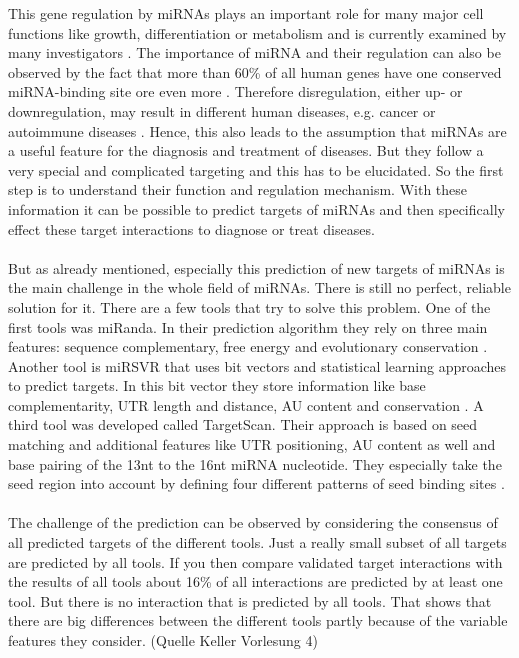 \documentclass[12pt]{article}
\begin{document}
This gene regulation by miRNAs plays an important role for many major cell functions like growth, differentiation or metabolism and is currently examined by many investigators \cite{Ardekani}. The importance of miRNA and their regulation can also be observed by the fact that more than 60\% of all human genes have one conserved miRNA-binding site ore even more \cite{Ha}. Therefore disregulation, either up- or downregulation, may result in different human diseases, e.g. cancer or autoimmune diseases \cite{Ardekani}. Hence, this also leads to the assumption that miRNAs are a useful feature for the diagnosis and treatment of diseases. But they follow a very special and complicated targeting and this has to be elucidated. So the first step is to understand their function and regulation mechanism. With these information it can be possible to predict targets of miRNAs and then specifically effect these target interactions to diagnose or treat diseases. \\\\
But as already mentioned, especially this prediction of new targets of miRNAs is the main challenge in the whole field of miRNAs. There is still no perfect, reliable solution for it. There are a few tools that try to solve this problem. One of the first tools was miRanda. In their prediction algorithm they rely on three main features: sequence complementary, free energy and evolutionary conservation \cite{Enright}. Another tool is miRSVR that uses bit vectors and statistical learning approaches to predict targets. In this bit vector they store information like base complementarity, UTR length and distance, AU content and conservation \cite{Betel}. A third tool was developed called TargetScan. Their approach is based on seed matching and additional features like UTR positioning, AU content as well and base pairing of the 13nt to the 16nt miRNA nucleotide. They especially take the seed region into account by defining four different patterns of seed binding sites \cite{Lewis}.\\\\
The challenge of the prediction can be observed by considering the consensus of all predicted targets of the different tools.  Just a really small subset of all targets are predicted by all tools. If you then compare validated target interactions with the results of all tools about 16\% of all interactions are predicted by at least one tool. But there is no interaction that is predicted by all tools. That shows that there are big differences between the different tools partly because of the variable features they consider. (Quelle Keller Vorlesung 4) \\\\
\end{document}
